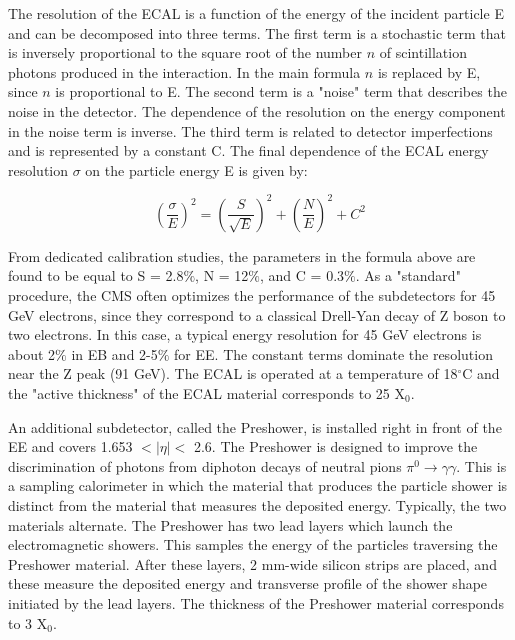 \begin{normalsize}
The resolution of the ECAL is a function of the energy of the incident particle E and can be decomposed into three terms. The first term is a stochastic term that is inversely proportional to the square root of the number $n$ of scintillation photons produced in the interaction. In the main formula $n$ is replaced by E, since $n$ is proportional to E. The second term is a "noise" term that describes the noise in the detector. The dependence of the resolution on the energy component in the noise term is inverse. The third term is related to detector imperfections and is represented by a constant C. The final dependence of the ECAL energy resolution $\sigma$ on the particle energy E is given by:

  
\begin{equation}
  \left(\frac{\sigma}{E}\right)^2 = \left(\frac{S}{\sqrt{E}}\right)^2 +
  \left(\frac{N}{E}\right)^2 + C^2
  \label{eq:ecal}
\end{equation}

From dedicated calibration studies, the parameters in the formula above are found to be equal to S = 2.8$\%$, N = 12$\%$, and C = 0.3$\%$. As a "standard" procedure, the CMS often optimizes the performance of the subdetectors for 45 GeV electrons, since they correspond to a classical Drell-Yan decay of Z boson to two electrons. In this case, a typical energy resolution for 45 GeV electrons is about 2$\%$ in EB and 2-5$\%$ for EE. The constant terms dominate the resolution near the Z peak (91 GeV). The ECAL is operated at a temperature of 18$^{\circ}$C and the "active thickness" of the ECAL material corresponds to 25 X$_0$. 

An additional subdetector, called the Preshower, is installed right in front of the EE and covers 1.653 $ < | \eta |  < $ 2.6. The Preshower is designed to improve the discrimination of photons from diphoton decays of neutral pions $\pi^0 \rightarrow \gamma \gamma$. This is a sampling calorimeter in which the material that produces the particle shower is distinct from the material that measures the deposited energy. Typically, the two materials alternate. The Preshower has two lead layers which launch the electromagnetic showers. This samples the energy of the particles traversing the Preshower material.  After these layers, 2 mm-wide silicon strips are placed, and these measure the deposited energy and transverse profile of the shower shape initiated by the lead layers. The thickness of the Preshower material corresponds to 3 X$_0$.





\end{normalsize}
